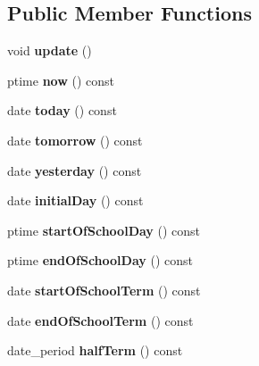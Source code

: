 \subsection*{Public Member Functions}
\begin{DoxyCompactItemize}
\item 
\mbox{\label{classtiming_a5c91382984c1f17f3678030277bca2b7}} 
void {\bfseries update} ()
\item 
\mbox{\label{classtiming_aff54a0e908c64c52155ab254e4c16b31}} 
ptime {\bfseries now} () const
\item 
\mbox{\label{classtiming_af7f37b61e8ad76615b81a9e620ed1b20}} 
date {\bfseries today} () const
\item 
\mbox{\label{classtiming_a32e58b29ebab4444095da675a7366311}} 
date {\bfseries tomorrow} () const
\item 
\mbox{\label{classtiming_a386cc29fbab2bcb13c319fa5847e6c02}} 
date {\bfseries yesterday} () const
\item 
\mbox{\label{classtiming_a89db990194b162a228a1db8497a78bdf}} 
date {\bfseries initial\+Day} () const
\item 
\mbox{\label{classtiming_aa6fa7d6bb3338a83cf26deddab164dcd}} 
ptime {\bfseries start\+Of\+School\+Day} () const
\item 
\mbox{\label{classtiming_a44b6864a75b11c761eaaa6d6546f5c92}} 
ptime {\bfseries end\+Of\+School\+Day} () const
\item 
\mbox{\label{classtiming_add6be686df899d4d114545f791ceb5d0}} 
date {\bfseries start\+Of\+School\+Term} () const
\item 
\mbox{\label{classtiming_a672fd71230612e481b36eb408497c816}} 
date {\bfseries end\+Of\+School\+Term} () const
\item 
\mbox{\label{classtiming_aa5bd281f145600c23293b94577799ca8}} 
date\+\_\+period {\bfseries half\+Term} () const
\item 

\end{DoxyCompactItemize}

